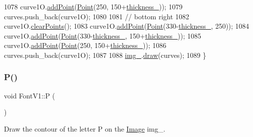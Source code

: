 \begin{DoxyCode}
1078     curve1O.\mbox{\hyperlink{class_bezier_curve_a38d16c18b36ae45619b05e26e226cf34}{addPoint}}(\mbox{\hyperlink{class_point}{Point}}(250, 150+\mbox{\hyperlink{class_font_v1_aed8040e76be9a52833627b92f0fb4e5f}{thickness\_}}));
1079     curves.push\_back(curve1O);
1080 
1081     \textcolor{comment}{// bottom right}
1082     curve1O.\mbox{\hyperlink{class_bezier_curve_a0ba8ce66d5af5971ae6a1b506029728e}{clearPoints}}();
1083     curve1O.\mbox{\hyperlink{class_bezier_curve_a38d16c18b36ae45619b05e26e226cf34}{addPoint}}(\mbox{\hyperlink{class_point}{Point}}(330-\mbox{\hyperlink{class_font_v1_aed8040e76be9a52833627b92f0fb4e5f}{thickness\_}}, 250));
1084     curve1O.\mbox{\hyperlink{class_bezier_curve_a38d16c18b36ae45619b05e26e226cf34}{addPoint}}(\mbox{\hyperlink{class_point}{Point}}(330-\mbox{\hyperlink{class_font_v1_aed8040e76be9a52833627b92f0fb4e5f}{thickness\_}}, 150+\mbox{\hyperlink{class_font_v1_aed8040e76be9a52833627b92f0fb4e5f}{thickness\_}}));
1085     curve1O.\mbox{\hyperlink{class_bezier_curve_a38d16c18b36ae45619b05e26e226cf34}{addPoint}}(\mbox{\hyperlink{class_point}{Point}}(250, 150+\mbox{\hyperlink{class_font_v1_aed8040e76be9a52833627b92f0fb4e5f}{thickness\_}}));
1086     curves.push\_back(curve1O);
1087 
1088     \mbox{\hyperlink{class_font_v1_a00569e3e3c4b70f437b63f396f735fb0}{img\_}}.\mbox{\hyperlink{class_image_a8d162f3cab956131d58708c09aa560b0}{draw}}(curves);
1089 \}
\end{DoxyCode}
\mbox{\label{class_font_v1_aeaf56ebe48a78aedf53626f50f10ee4d}} 
\subsubsection{\texorpdfstring{P()}{P()}}
{\footnotesize\ttfamily void Font\+V1\+::P (\begin{DoxyParamCaption}{ }\end{DoxyParamCaption})}



Draw the contour of the letter P on the \mbox{\hyperlink{class_image}{Image}} img\+\_\+. 


